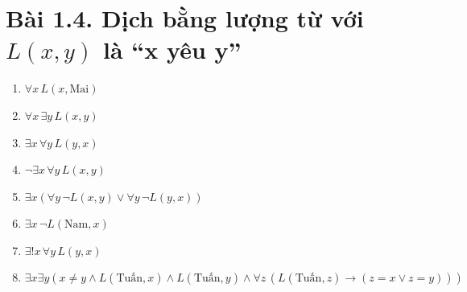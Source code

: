 \documentclass[12pt]{article}
\begin{document}
\section*{Bài 1.4. Dịch bằng lượng từ với $L(x, y)$ là “x yêu y”}
\begin{enumerate}[label=\alph*)]
    \item $\forall x\, L(x, \text{Mai})$
    \item $\forall x\, \exists y\, L(x, y)$
    \item $\exists x\, \forall y\, L(y, x)$
    \item $\neg \exists x\, \forall y\, L(x, y)$
    \item $\exists x (\forall y\, \neg L(x, y) \lor \forall y\, \neg L(y, x))$
    \item $\exists x\, \neg L(\text{Nam}, x)$
    \item $\exists! x\, \forall y\, L(y, x)$
    \item $\exists x \exists y (x \neq y \land L(\text{Tuấn}, x) \land L(\text{Tuấn}, y) \land \forall z\, (L(\text{Tuấn}, z) \rightarrow (z = x \lor z = y)))$
\end{enumerate}
\end{document}
